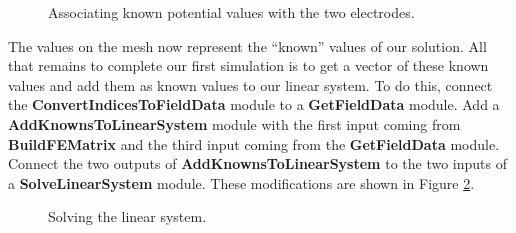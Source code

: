 \documentclass[fleqn,11pt,openany]{book}
\begin{document}
\begin{figure}
\caption{Associating known potential values with the two
electrodes.}\label{fig:defib_fem_nw_06}
\end{figure}

The values on the mesh now represent the ``known'' values of our
solution. All that remains to complete our first simulation is to get
a vector of these known values and add them as known values to our
linear system. To do this, connect the {\bf ConvertIndicesToFieldData}
module to a {\bf GetFieldData} module. Add a {\bf
AddKnownsToLinearSystem} module with the first input coming from {\bf
BuildFEMatrix} and the third input coming from the {\bf GetFieldData}
module. Connect the two outputs of {\bf AddKnownsToLinearSystem} to
the two inputs of a {\bf SolveLinearSystem} module. These
modifications are shown in Figure \ref{fig:defib_fem_nw_07}.

\begin{figure}
\caption{Solving the linear system.}\label{fig:defib_fem_nw_07}
\end{figure}
\end{document}
